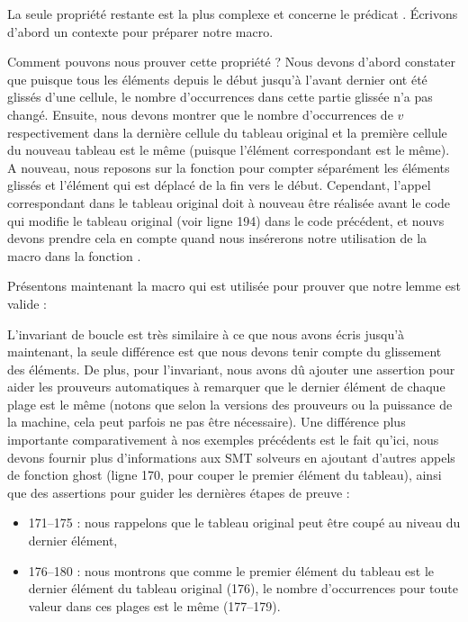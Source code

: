 

La seule propriété restante est la plus complexe et concerne le prédicat
. Écrivons d'abord un contexte pour préparer notre
macro.




Comment pouvons nous prouver cette propriété ? Nous devons d'abord constater
que puisque tous les éléments depuis le début jusqu'à l'avant dernier ont été
glissés d'une cellule, le nombre d'occurrences dans cette partie glissée n'a
pas changé. Ensuite, nous devons montrer que le nombre d'occurrences de $v$
respectivement dans la dernière cellule du tableau original et la première 
cellule du nouveau tableau est le même (puisque l'élément correspondant est le
même). A nouveau, nous reposons sur la fonction  pour compter
séparément les éléments glissés et l'élément qui est déplacé de la fin vers le
début. Cependant, l'appel correspondant dans le tableau original doit à nouveau
être réalisée avant le code qui modifie le tableau original (voir ligne 194) dans
le code précédent, et nouvs devons prendre cela en compte quand nous insérerons
notre utilisation de la macro dans la fonction .


Présentons maintenant la macro qui est utilisée pour prouver que notre lemme
est valide :




L'invariant de boucle est très similaire à ce que nous avons écris jusqu'à
maintenant, la seule différence est que nous devons tenir compte du glissement
des éléments. De plus, pour l'invariant, nous avons dû ajouter une assertion 
pour aider les prouveurs automatiques à remarquer que le dernier élément de
chaque plage est le même (notons que selon la versions des prouveurs ou la
puissance de la machine, cela peut parfois ne pas être nécessaire). Une différence
plus importante comparativement à nos exemples précédents est le fait qu'ici, nous
devons fournir plus d'informations aux SMT solveurs en ajoutant d'autres appels
de fonction ghost (ligne 170, pour couper le premier élément du tableau), ainsi
que des assertions pour guider les dernières étapes de preuve :


\begin{itemize}
    \item 171--175 : nous rappelons que le tableau original peut être coupé au
          niveau du dernier élément,
    \item 176--180 : nous montrons que comme le premier élément du tableau est le 
          dernier élément du tableau original (176), le nombre d'occurrences pour
          toute valeur dans ces plages est le même (177--179).
\end{itemize}


